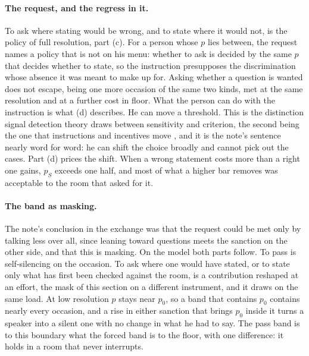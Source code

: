 \paragraph{The request, and the regress in it.} To ask where stating would be wrong, and to state where it would not, is the policy of full resolution, part (c). For a person whose $p$ lies between, the request names a policy that is not on his menu: whether to ask is decided by the same $p$ that decides whether to state, so the instruction presupposes the discrimination whose absence it was meant to make up for. Asking whether a question is wanted does not escape, being one more occasion of the same two kinds, met at the same resolution and at a further cost in floor. What the person can do with the instruction is what (d) describes. He can move a threshold. This is the distinction signal detection theory draws between sensitivity and criterion, the second being the one that instructions and incentives move \cite{GreenSwets1966}, and it is the note's sentence nearly word for word: he can shift the choice broadly and cannot pick out the cases. Part (d) prices the shift. When a wrong statement costs more than a right one gains, $p_S$ exceeds one half, and most of what a higher bar removes was acceptable to the room that asked for it.

\paragraph{The band as masking.} The note's conclusion in the exchange was that the request could be met only by talking less over all, since leaning toward questions meets the sanction on the other side, and that this is masking. On the model both parts follow. To pass is self-silencing on the occasion. To ask where one would have stated, or to state only what has first been checked against the room, is a contribution reshaped at an effort, the mask of this section on a different instrument, and it draws on the same load. At low resolution $p$ stays near $p_0$, so a band that contains $p_0$ contains nearly every occasion, and a rise in either sanction that brings $p_0$ inside it turns a speaker into a silent one with no change in what he had to say. The pass band is to this boundary what the forced band is to the floor, with one difference: it holds in a room that never interrupts.

